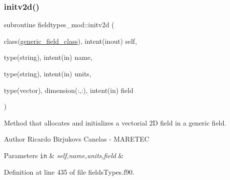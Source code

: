 \subsubsection{\texorpdfstring{initv2d()}{initv2d()}}
{\footnotesize\ttfamily subroutine fieldtypes\+\_\+mod\+::initv2d (\begin{DoxyParamCaption}\item[{class(\mbox{\hyperlink{structfieldtypes__mod_1_1generic__field__class}{generic\+\_\+field\+\_\+class}}), intent(inout)}]{self,  }\item[{type(string), intent(in)}]{name,  }\item[{type(string), intent(in)}]{units,  }\item[{type(vector), dimension(\+:,\+:), intent(in)}]{field }\end{DoxyParamCaption})\hspace{0.3cm}{\ttfamily [private]}}



Method that allocates and initializes a vectorial 2D field in a generic field. 

\begin{DoxyAuthor}{Author}
Ricardo Birjukovs Canelas -\/ M\+A\+R\+E\+T\+EC 
\end{DoxyAuthor}

\begin{DoxyParams}[1]{Parameters}
\mbox{\tt in}  & {\em self,name,units,field} & \\
\hline
\end{DoxyParams}


Definition at line 435 of file fields\+Types.\+f90.


